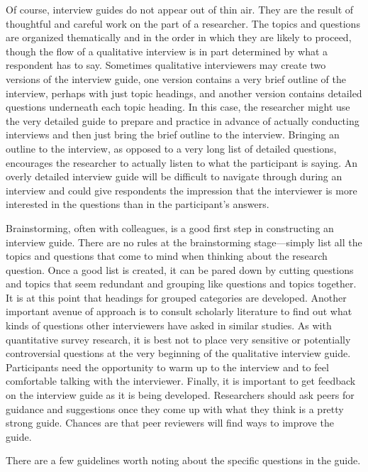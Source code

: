 Of course, interview guides do not appear out of thin air. They are the result of thoughtful and careful work on the part of a researcher. The topics and questions are organized thematically and in the order in which they are likely to proceed, though the flow of a qualitative interview is in part determined by what a respondent has to say. Sometimes qualitative interviewers may create two versions of the interview guide, one version contains a very brief outline of the interview, perhaps with just topic headings, and another version contains detailed questions underneath each topic heading. In this case, the researcher might use the very detailed guide to prepare and practice in advance of actually conducting interviews and then just bring the brief outline to the interview. Bringing an outline to the interview, as opposed to a very long list of detailed questions, encourages the researcher to actually listen to what the participant is saying. An overly detailed interview guide will be difficult to navigate through during an interview and could give respondents the impression that the interviewer is more interested in the questions than in the participant's answers.

Brainstorming, often with colleagues, is a good first step in constructing an interview guide. There are no rules at the brainstorming stage---simply list all the topics and questions that come to mind when thinking about the research question. Once a good list is created, it can be pared down by cutting questions and topics that seem redundant and grouping like questions and topics together. It is at this point that headings for grouped categories are developed. Another important avenue of approach is to consult scholarly literature to find out what kinds of questions other interviewers have asked in similar studies. As with quantitative survey research, it is best not to place very sensitive or potentially controversial questions at the very beginning of the qualitative interview guide. Participants need the opportunity to warm up to the interview and to feel comfortable talking with the interviewer. Finally, it is important to get feedback on the interview guide as it is being developed. Researchers should ask peers for guidance and suggestions once they come up with what they think is a pretty strong guide. Chances are that peer reviewers will find ways to improve the guide.

There are a few guidelines worth noting about the specific questions in the guide.


